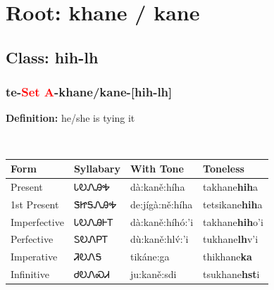 \needspace{4in}
\section*{Root: khane / kane}
\nopagebreak
{}
\needspace{3in}
\subsection*{Class: hih-lh}
\nopagebreak
\needspace{2in}
\subsubsection*{te{-}\textcolor{Red}{Set A}{-}\textbf{khane/kane}{-}[hih-lh]}
\nopagebreak
\textbf{Definition: } he/she is tying it
\\[0.5em]
\begin{tabularx}{\textwidth}{l X X X}%
\toprule%
\textbf{Form}&\textbf{Syllabary}&\textbf{With Tone}&\textbf{Toneless}\\%
\midrule%
Present&ᏓᎧᏁᎯᎭ&dà:kaně:híha&takhane\textbf{hih}a\\%
1st Present&ᏕᏥᎦᏁᎯᎭ&de:jígà:ně:híha&tetsikane\textbf{hih}a\\%
Imperfective&ᏓᎧᏁᎯᎰᎢ&dà:kaně:híhó:’i&takhane\textbf{hih}o'i\\%
Perfective&ᏚᎧᏁᏢᎢ&dù:kaně:hlv́:’i&tukhane\textbf{lh}v'i\\%
Imperative&ᏘᎧᏁᎦ&tikáne:ga&thikhane\textbf{ka}\\%
Infinitive&ᏧᎧᏁᏍᏗ&ju:kaně:sdi&tsukhane\textbf{hst}i\\%
\bottomrule%
\end{tabularx}
\\[1em]